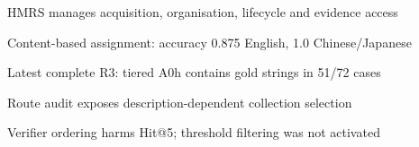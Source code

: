 \begin{highlights}
\item HMRS manages acquisition, organisation, lifecycle and evidence access
\item Content-based assignment: accuracy 0.875 English, 1.0 Chinese/Japanese
\item Latest complete R3: tiered A0h contains gold strings in 51/72 cases
\item Route audit exposes description-dependent collection selection
\item Verifier ordering harms Hit@5; threshold filtering was not activated
\end{highlights}
